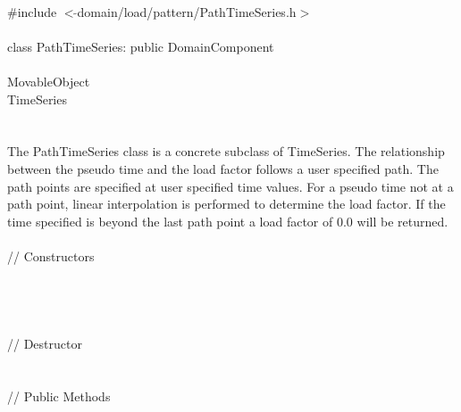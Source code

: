 
   \\
\indent \#include $<\tilde{ }$domain/load/pattern/PathTimeSeries.h$>$  \\

  \\
\indent class PathTimeSeries: public DomainComponent  \\

 \\
\indent MovableObject \\
\indent\indent TimeSeries \\
\indent\indent{} \\

 \\ 
\indent The PathTimeSeries class is a concrete subclass of TimeSeries.
The relationship between the pseudo time and the load factor follows
a user specified path. The path points are specified at user specified
time values. For a pseudo time not at a path point, linear interpolation
is performed to determine the load factor. If the time specified is
beyond the last path point a load factor of $0.0$ will be returned.\\

 \\
\indent // Constructors \\ 
\\ 
\\ 
\\ \\
\indent // Destructor \\ 
\\  \\
\indent // Public Methods \\ 
\\
\\
\\
\\

